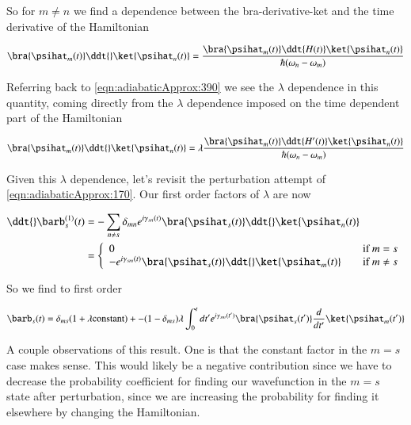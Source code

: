 So for $m \ne n$ we find a dependence between the bra-derivative-ket and the time derivative of the Hamiltonian

\begin{equation}\label{eqn:adiabaticApprox:410}
\bra{\psihat_m(t)}
\ddt{} \ket{\psihat_n(t)} 
=
\frac{
\bra{\psihat_m(t)}
\ddt{H(t)} \ket{\psihat_n(t)} 
}
{
\hbar (\omega_n - \omega_m) 
}
\end{equation}

Referring back to \ref{eqn:adiabaticApprox:390} we see the $\lambda$ dependence in this quantity, coming directly from the $\lambda$ dependence imposed on the time dependent part of the Hamiltonian

\begin{equation}\label{eqn:adiabaticApprox:430}
\bra{\psihat_m(t)}
\ddt{} \ket{\psihat_n(t)} 
=
\lambda
\frac{
\bra{\psihat_m(t)}
\ddt{H'(t)} \ket{\psihat_n(t)} 
}
{
\hbar (\omega_n - \omega_m) 
}
\end{equation}

Given this $\lambda$ dependence, let's revisit the perturbation attempt of \ref{eqn:adiabaticApprox:170}.  Our first order factors of $\lambda$ are now

\begin{align*}
\ddt{} \barb_s^{(1)}(t) 
&= - \sum_{n \ne s} \delta_{mn} e^{i \gamma_{sn}(t) } \bra{\psihat_s(t)} \ddt{} \ket{\psihat_n(t)} \\
&= 
\left\{
\begin{array}{l l}
0 & 
\quad \mbox{if $m = s$} \\
- e^{i \gamma_{sm}(t) } \bra{\psihat_s(t)} \ddt{} \ket{\psihat_m(t)} &
\quad \mbox{if $m \ne s$} \\
\end{array}
\right.
\end{align*}

So we find to first order

\begin{equation}\label{eqn:adiabaticApprox:450}
\barb_s(t) 
=
\delta_{ms}(1 + \lambda \text{constant})
+ 
- 
(1-\delta_{ms}) \lambda
\int_0^t dt'
e^{i \gamma_{sm}(t') } \bra{\psihat_s(t')} \frac{d}{dt'} \ket{\psihat_m(t')} 
\end{equation}

A couple observations of this result.  One is that the constant factor in the $m = s$ case makes sense.  This would likely be a negative contribution since we have to decrease the probability coefficient for finding our wavefunction in the $m = s$ state after perturbation, since we are increasing the probability for finding it elsewhere by changing the Hamiltonian.

